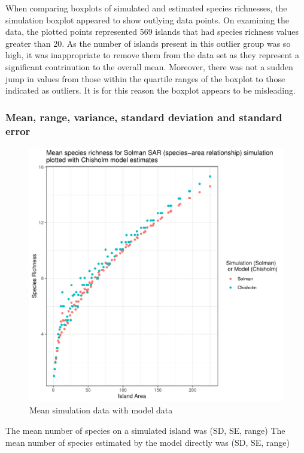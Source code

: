 \documentclass{article}
\begin{document}
When comparing boxplots of simulated and estimated species richnesses, the simulation boxplot appeared to show outlying data points. On examining the data, the plotted points represented 569 islands that had species richness values greater than 20. As the number of islands present in this outlier group was so high, it was inappropriate to remove them from the data set as they represent a significant contrinution to the overall mean. Moreover, there was not a sudden jump in values from those within the quartile ranges of the boxplot to those indicated as outliers. It is for this reason the boxplot appears to be misleading.  

\subsubsection{Mean, range, variance, standard deviation and standard error}

\begin{figure}
\centering
  \includegraphics[scale=0.5]{../../Results/Simulation/MeanResultsPlot.pdf}
  \caption{Mean simulation data with model data}
  \label{fig:MeanPlot}
\end{figure}

The mean number of species on a simulated island was (SD, SE, range)
The mean number of species estimated by the model directly was (SD, SE, range)
\end{document}
